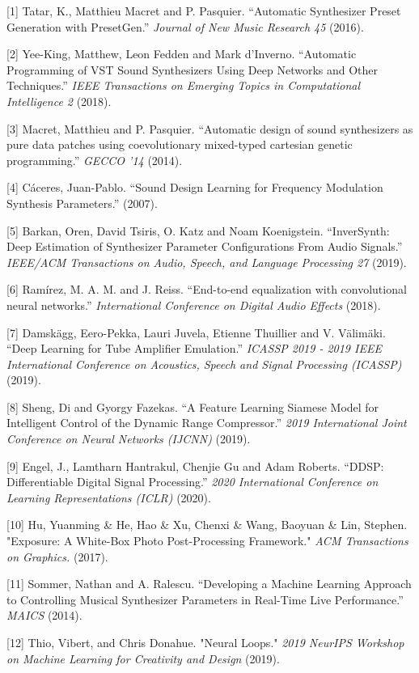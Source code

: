 \documentclass{article}
\begin{document}
[1] Tatar, K., Matthieu Macret and P. Pasquier. “Automatic Synthesizer Preset Generation with PresetGen.” \emph{Journal of New Music Research 45} (2016).

[2] Yee-King, Matthew, Leon Fedden and Mark d'Inverno. “Automatic Programming of VST Sound Synthesizers Using Deep Networks and Other Techniques.” \emph{IEEE Transactions on Emerging Topics in Computational Intelligence 2} (2018).

[3] Macret, Matthieu and P. Pasquier. “Automatic design of sound synthesizers as pure data patches using coevolutionary mixed-typed cartesian genetic programming.” \emph{GECCO '14} (2014).

[4] Cáceres, Juan-Pablo. “Sound Design Learning for Frequency Modulation Synthesis Parameters.” (2007).

[5] Barkan, Oren, David Tsiris, O. Katz and Noam Koenigstein. “InverSynth: Deep Estimation of Synthesizer Parameter Configurations From Audio Signals.” \emph{IEEE/ACM Transactions on Audio, Speech, and Language Processing 27} (2019).

[6] Ramírez, M. A. M. and J. Reiss. “End-to-end equalization with convolutional neural networks.” \emph{International Conference on Digital Audio Effects} (2018).

[7] Damskägg, Eero-Pekka, Lauri Juvela, Etienne Thuillier and V. Välimäki. “Deep Learning for Tube Amplifier Emulation.” \emph{ICASSP 2019 - 2019 IEEE International Conference on Acoustics, Speech and Signal Processing (ICASSP)} (2019).

[8] Sheng, Di and Gyorgy Fazekas. “A Feature Learning Siamese Model for Intelligent Control of the Dynamic Range Compressor.” \emph{2019 International Joint Conference on Neural Networks (IJCNN)} (2019).

[9] Engel, J., Lamtharn Hantrakul, Chenjie Gu and Adam Roberts. “DDSP: Differentiable Digital Signal Processing.” \emph{2020 International Conference on Learning Representations (ICLR)} (2020).

[10] Hu, Yuanming \& He, Hao \& Xu, Chenxi \& Wang, Baoyuan \& Lin, Stephen.  "Exposure: A White-Box Photo Post-Processing Framework." \emph{ACM Transactions on Graphics.} (2017).

[11] Sommer, Nathan and A. Ralescu. “Developing a Machine Learning Approach to Controlling Musical Synthesizer Parameters in Real-Time Live Performance.” \emph{MAICS} (2014).

[12] Thio, Vibert, and Chris Donahue. "Neural Loops." \emph{2019 NeurIPS Workshop on Machine Learning for Creativity and Design} (2019).   
\end{document}
